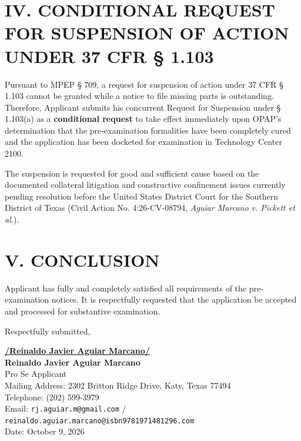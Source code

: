 \documentclass[11pt,letterpaper]{article}
\begin{document}
\section*{IV. CONDITIONAL REQUEST FOR SUSPENSION OF ACTION UNDER 37 CFR \S{} 1.103}

Pursuant to MPEP \S{} 709, a request for suspension of action under 37 CFR \S{} 1.103 cannot be granted while a notice to file missing parts is outstanding. Therefore, Applicant submits his concurrent Request for Suspension under \S{} 1.103(a) as a \textbf{conditional request} to take effect immediately upon OPAP's determination that the pre-examination formalities have been completely cured and the application has been docketed for examination in Technology Center 2100.

The suspension is requested for good and sufficient cause based on the documented collateral litigation and constructive confinement issues currently pending resolution before the United States District Court for the Southern District of Texas (Civil Action No. 4:26-CV-08794, \textit{Aguiar Marcano v. Pickett et al.}).

\section*{V. CONCLUSION}

Applicant has fully and completely satisfied all requirements of the pre-examination notices. It is respectfully requested that the application be accepted and processed for substantive examination.

\vspace{0.8cm}
\begin{singlespace}
\noindent Respectfully submitted, \par\vspace{1.5cm}
\underline{\textbf{/Reinaldo Javier Aguiar Marcano/}} \\
\textbf{Reinaldo Javier Aguiar Marcano} \\
Pro Se Applicant \\
Mailing Address: 2302 Britton Ridge Drive, Katy, Texas 77494 \\
Telephone: (202) 599-3979 \\
Email: \texttt{rj.aguiar.m@gmail.com} / \texttt{reinaldo.aguiar.marcano@isbn9781971481296.com} \\
Date: October 9, 2026
\end{singlespace}
\end{document}
